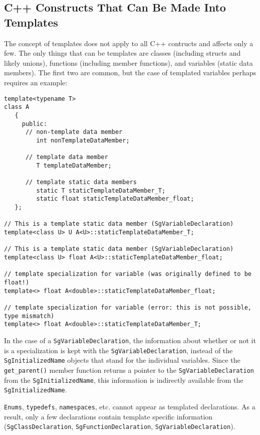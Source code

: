 \subsection{C++ Constructs That Can Be Made Into Templates}
   The concept of templates does not apply to all C++ contructs and affects only a few.
The only things that can be templates are classes (including structs and likely unions),
functions (including member functions), and variables (static data
members).  The first two are common, but the case of templated variables perhaps requires 
an example:

{\indent
{\mySmallFontSize

\begin{verbatim}
template<typename T>
class A
   {
     public:
      // non-template data member
         int nonTemplateDataMember;

      // template data member
         T templateDataMember;

      // template static data members
         static T staticTemplateDataMember_T;
         static float staticTemplateDataMember_float;
   };
         
// This is a template static data member (SgVariableDeclaration)
template<class U> U A<U>::staticTemplateDataMember_T;

// This is a template static data member (SgVariableDeclaration)
template<class U> float A<U>::staticTemplateDataMember_float;

// template specialization for variable (was originally defined to be float!)
template<> float A<double>::staticTemplateDataMember_float;

// template specialization for variable (error: this is not possible, type mismatch)
template<> float A<double>::staticTemplateDataMember_T;
\end{verbatim}
}}

   In the case of a {\tt SgVariableDeclaration}, the information about whether or not it is a specialization
is kept with the {\tt SgVariableDeclaration}, instead of the {\tt SgInitializedName} objects that
stand for the individual variables.  Since the {\tt get\_parent()} member function returns
a pointer to the {\tt SgVariableDeclaration} from the {\tt SgInitializedName}, this
information is indirectly available from the {\tt SgInitializedName}.

  {\tt Enums}, {\tt typedefs}, {\tt namespaces}, etc. cannot appear as templated declarations.
As a result, only a few declarations contain template specific information
({\tt SgClassDeclaration}, {\tt SgFunctionDeclaration}, {\tt SgVariableDeclaration}).

